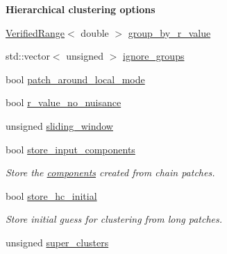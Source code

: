 \begin{Indent}{\bf Hierarchical clustering options}\par
{\em \label{_amgrp4c1e04d10384c153c511d8866b765e01}
 }\begin{DoxyCompactItemize}
\item 
\hyperlink{classeos_1_1VerifiedRange}{VerifiedRange}$<$ double $>$ \hyperlink{structeos_1_1PopulationMonteCarloSampler_1_1Config_adf9f35d7f54defd04b9486de7d705ffa}{group\_\-by\_\-r\_\-value}
\item 
std::vector$<$ unsigned $>$ \hyperlink{structeos_1_1PopulationMonteCarloSampler_1_1Config_a27ea93f2181c10068424f2b7e24fbc14}{ignore\_\-groups}
\item 
bool \hyperlink{structeos_1_1PopulationMonteCarloSampler_1_1Config_a0bffb06da5f9f3ef917eec1ce2139ce1}{patch\_\-around\_\-local\_\-mode}
\item 
bool \hyperlink{structeos_1_1PopulationMonteCarloSampler_1_1Config_a5e3c5e1375b04890db40b3d7581b5413}{r\_\-value\_\-no\_\-nuisance}
\item 
unsigned \hyperlink{structeos_1_1PopulationMonteCarloSampler_1_1Config_a9d8798a5789fd4fbe250dba673b92df6}{sliding\_\-window}
\item 
bool \hyperlink{structeos_1_1PopulationMonteCarloSampler_1_1Config_a1ddf56fd57dd8dd3c4462dd1cb2800ab}{store\_\-input\_\-components}
\begin{DoxyCompactList}\small\item\em Store the \hyperlink{namespaceeos_1_1components}{components} created from chain patches. \item\end{DoxyCompactList}\item 
bool \hyperlink{structeos_1_1PopulationMonteCarloSampler_1_1Config_ad24a2d883fe9d2faedbcf4f861bc9d82}{store\_\-hc\_\-initial}
\begin{DoxyCompactList}\small\item\em Store initial guess for clustering from long patches. \item\end{DoxyCompactList}\item 
unsigned \hyperlink{structeos_1_1PopulationMonteCarloSampler_1_1Config_a906c7eeded237f7bbe810a8d03d8402b}{super\_\-clusters}
\end{DoxyCompactItemize}
\end{Indent}
